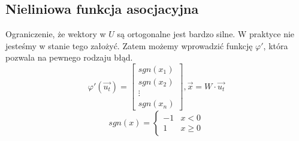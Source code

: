 \documentclass{../notatki}
\begin{document}
\subsection{Nieliniowa funkcja asocjacyjna}

Ograniczenie, że wektory w $U$ są ortogonalne jest bardzo silne.
W praktyce nie jesteśmy w stanie tego założyć. Zatem możemy wprowadzić
funkcję $\varphi'$, która pozwala na pewnego rodzaju błąd.
$$
\varphi'(\vec{u_t}) =
\begin{bmatrix}
  sgn(x_1) \\ sgn(x_2) \\ \vdots \\ sgn(x_n)
\end{bmatrix}, \vec{x} = W \cdot \vec{u_t}
$$
$$
sgn(x) =
\begin{cases}
  -1 & x < 0\\
  1 & x \geq 0
\end{cases}
$$
\end{document}
